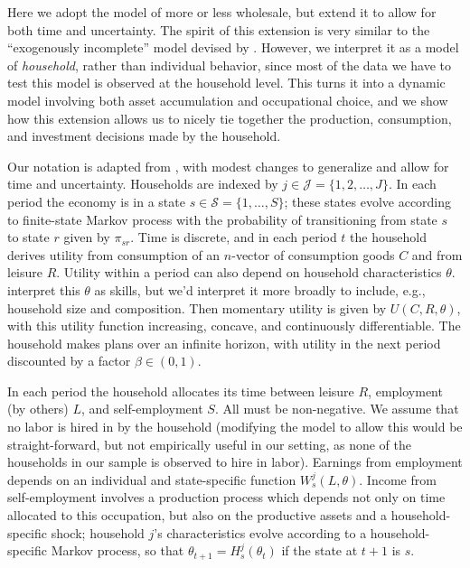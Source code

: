 \documentclass[12pt,letterpaper]{article}
\begin{document}
Here we adopt the model of \cite{Bandiera-etal15} more or less
wholesale, but extend it to allow for both time and uncertainty.  The
spirit of this extension is very similar to the ``exogenously
incomplete'' model devised by \cite{Karaivanov-Townsend14}.  However,
we interpret it as a model of \emph{household}, rather than
individual behavior, since most of the data we have to test this
model is observed at the household level.  This turns it into a
dynamic model involving both asset accumulation and occupational
choice, and we show how this extension allows us to nicely tie
together the production, consumption, and investment decisions made
by the household.

Our notation is adapted from \cite{bandiera-etal15}, with modest
changes to generalize and allow for time and uncertainty.  Households
are indexed by \(j\in\mathcal{J}=\{1,2,\dots,J\}\).  In each
period the economy is in a state \(s\in\mathcal{S}=\{1,\dots,S\}\);
these states evolve according to finite-state Markov process with the
probability of transitioning from state \(s\) to state \(r\) given by
\(\pi_{sr}\).  Time is discrete, and in each period \(t\) the household
derives utility from consumption of an \(n\)-vector of consumption goods
\(C\) and from leisure \(R\).  Utility within a period can also depend on
household characteristics \(\theta\).  \cite{bandiera-etal15} interpret
this \(\theta\) as skills, but we'd interpret it more broadly to include,
e.g., household size and composition.  Then momentary utility is given
by \(U(C,R,\theta)\), with this utility function increasing, concave,
and continuously differentiable.  The household makes plans over an
infinite horizon, with utility in the next period discounted by a
factor \(\beta\in(0,1)\).

In each period the household allocates its time between leisure \(R\),
employment (by others) \(L\), and self-employment \(S\). All must be
non-negative.  We assume that no labor is hired in by the household
(modifying the model to allow this would be straight-forward, but not
empirically useful in our setting, as none of the households in our
sample is observed to hire in labor).  Earnings from employment
depends on an individual and state-specific function
\(W^j_{s}(L,\theta)\).  Income from self-employment involves a
production process which depends not only on time allocated to this
occupation, but also on the productive assets and a
household-specific shock; household \(j\)'s characteristics evolve
according to a household-specific Markov process, so that
\(\theta_{t+1}=H^j_{s}(\theta_{t})\) if the state at \(t+1\) is \(s\).
\end{document}
